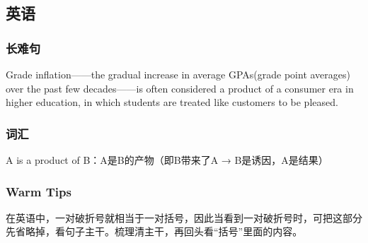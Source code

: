 \documentclass[UTF8]{ctexart}
\begin{document}
\subsection{英语}
\subsubsection{长难句}
Grade inflation——the gradual increase in average GPAs(grade point averages) over the past few decades——is often considered a product of a consumer era in higher education, in which students are treated like customers to be pleased.
\subsubsection{词汇}
A is a product of B：A是B的产物（即B带来了A → B是诱因，A是结果）
\subsubsection{Warm Tips}
在英语中，一对破折号就相当于一对括号，因此当看到一对破折号时，可把这部分先省略掉，看句子主干。梳理清主干，再回头看“括号”里面的内容。
\end{document}
